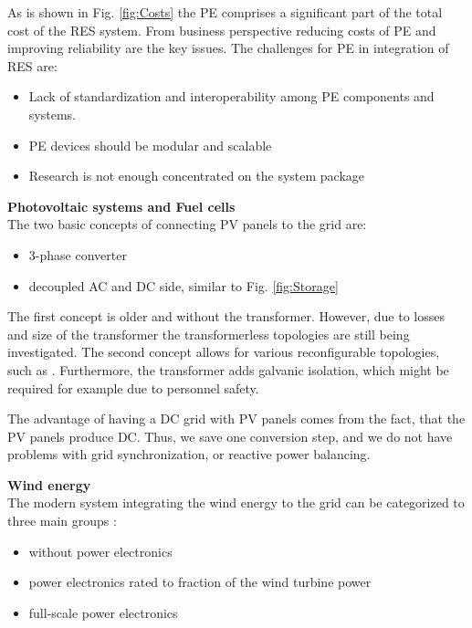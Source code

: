 \documentclass[]{scrartcl}
\begin{document}
As is shown in Fig. \ref{fig:Costs} the PE comprises a significant part of the total cost of the RES system. From business perspective reducing costs of PE and improving reliability are the key issues. The challenges for PE in integration of RES are\cite{Chakraborty2009}:

\begin{itemize}
	\item Lack of standardization and interoperability among PE components and systems. 
	\item PE devices should be modular and scalable
	\item Research is not enough concentrated on the system package
\end{itemize}

\textbf{Photovoltaic systems and Fuel cells} \\

The two basic concepts of connecting PV panels to the grid are:
\begin{itemize}
	\item 3-phase converter
	\item decoupled AC and DC side, similar to Fig. \ref{fig:Storage}
\end{itemize} 
The first concept is older and without the transformer. However, due to losses and size of the transformer the transformerless topologies are still being investigated\cite{Liserre2010}. The second concept allows for various reconfigurable topologies, such as \cite{Kim2013}. Furthermore, the transformer adds galvanic isolation, which might be required for example due to personnel safety. 

The advantage of having a DC grid with PV panels comes from the fact, that the PV panels produce DC. Thus, we save one conversion step, and we do not have problems with grid synchronization, or reactive power balancing. 


\textbf{Wind energy} \\


The modern system integrating the wind energy to the grid can be categorized to three main groups \cite{Technology2015}:
\begin{itemize}
	\item without power electronics
	\item power electronics rated to fraction of the wind turbine power
	\item full-scale power electronics
\end{itemize}
\end{document}

